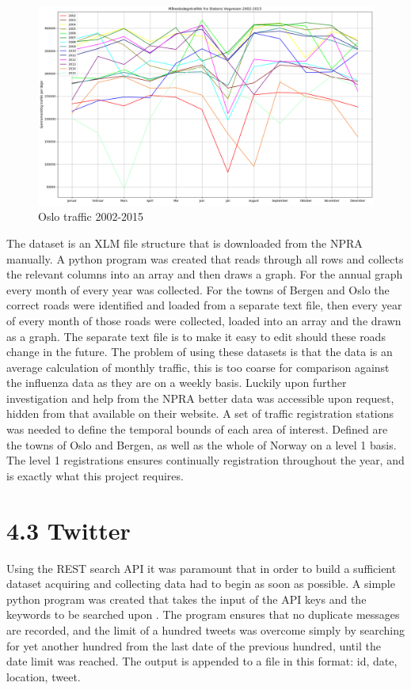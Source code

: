 \documentclass[11pt]{report}
\begin{document}
\begin{figure}[ht]
\includegraphics[width=16cm]{xml_02_15_annual_oslo}
\centering
\caption{Oslo traffic 2002-2015}
\label{fig:anualoslo}
\end{figure}
The dataset is an XLM file structure that is downloaded from the NPRA manually. A python program was created that reads through all rows and collects the relevant columns into an array and then draws a graph. For the annual graph every month of every year was collected. For the towns of Bergen and Oslo the correct roads were identified and loaded from a separate text file, then every year of every month of those roads were collected, loaded into an array and the drawn as a graph. The separate text file is to make it easy to edit should these roads change in the future.
The problem of using these datasets is that the data is an average calculation of monthly traffic, this is too coarse for comparison against the influenza data as they are on a weekly basis. Luckily upon further investigation and help from the NPRA better data was accessible upon request, hidden from that available on their website. A set of traffic registration stations was needed to define the temporal bounds of each area of interest. Defined are the towns of Oslo and Bergen, as well as the whole of Norway on a level 1 basis. The level 1 registrations ensures continually registration throughout the year, and is exactly what this project requires.

\newpage\newpage

\section*{4.3 Twitter}
Using the REST search API it was paramount that in order to build a sufficient dataset acquiring and collecting data had to begin as soon as possible. A simple python program was created that takes the input of the API keys and the keywords to be searched upon . The program ensures that no duplicate messages are recorded, and the limit of a hundred tweets was overcome simply by searching for yet another hundred from the last date of the previous hundred, until the date limit was reached.
The output is appended to a file in this format: id, date, location, tweet.
\end{document}
